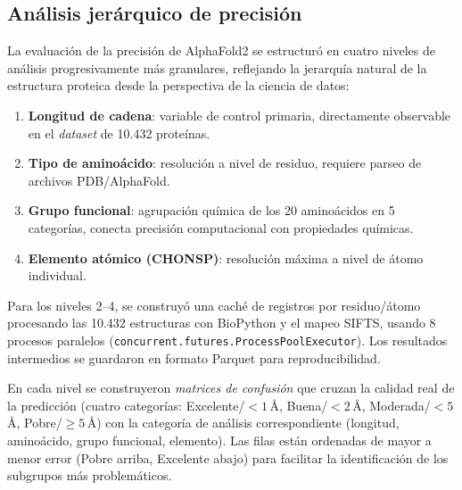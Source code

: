 \subsection{An\'alisis jer\'arquico de precisión}
\label{subsec:analisis_jerarquico}

La evaluación de la precisión de AlphaFold2 se estructuró en cuatro niveles de análisis
progresivamente más granulares, reflejando la jerarquía natural de la estructura proteica
desde la perspectiva de la ciencia de datos:

\begin{enumerate}
    \item \textbf{Longitud de cadena}: variable de control primaria, directamente observable en el \textit{dataset} de 10.432 proteínas.
    \item \textbf{Tipo de aminoácido}: resolución a nivel de residuo, requiere parseo de archivos PDB/AlphaFold.
    \item \textbf{Grupo funcional}: agrupación química de los 20 aminoácidos en 5 categorías, conecta precisión computacional con propiedades químicas.
    \item \textbf{Elemento atómico (CHONSP)}: resolución máxima a nivel de átomo individual.
\end{enumerate}

Para los niveles 2--4, se construyó una caché de registros por residuo/\'atomo
procesando las 10.432 estructuras con BioPython \citep{cock2009biopython} y el mapeo
SIFTS, usando 8 procesos paralelos (\texttt{concurrent.futures.ProcessPoolExecutor}).
Los resultados intermedios se guardaron en formato Parquet para reproducibilidad.

En cada nivel se construyeron \emph{matrices de confusión} que cruzan la calidad
real de la predicci\'on (cuatro categor\'ias: Excelente/$<1$\,\AA, Buena/$<2$\,\AA,
Moderada/$<5$\,\AA, Pobre/$\geq5$\,\AA) con la categor\'ia de an\'alisis correspondiente
(longitud, amino\'acido, grupo funcional, elemento). Las filas est\'an ordenadas de
mayor a menor error (Pobre arriba, Excelente abajo) para facilitar la identificaci\'on
de los subgrupos m\'as problem\'aticos.
